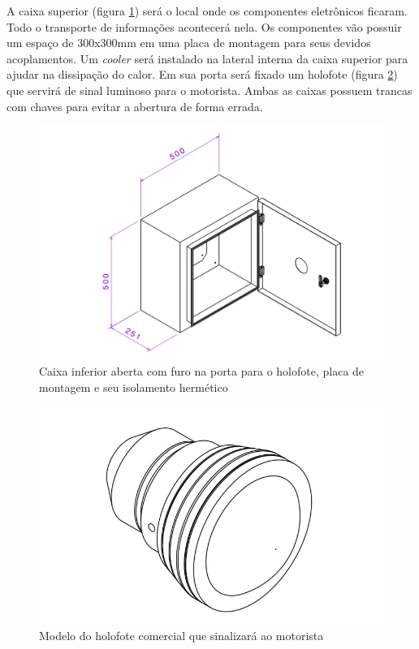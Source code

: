 A caixa superior (figura \ref{caixasup}) será o local onde os componentes eletrônicos ficaram. Todo o transporte de informações acontecerá nela. Os componentes vão possuir um espaço de 300x300mm em uma placa de montagem para seus devidos acoplamentos. Um \textit{cooler} será instalado na lateral interna da caixa superior para ajudar na dissipação do calor. Em sua porta será fixado um holofote (figura \ref{holof}) que servirá de sinal luminoso para o motorista. Ambas as caixas possuem trancas com chaves para evitar a abertura de forma errada.

\begin{figure}[H]
	\centering
    \includegraphics[keepaspectratio=true,scale=0.3]{figuras/caixasuperior.jpeg}
    \caption{Caixa inferior aberta com furo na porta para o holofote, placa de montagem e seu isolamento hermético}
    \label{caixasup}
\end{figure}

\begin{figure}[H]
	\centering
    \includegraphics[keepaspectratio=true,scale=0.3]{figuras/holofote.jpeg}
    \caption{Modelo do holofote comercial que sinalizará ao motorista}
    \label{holof}
\end{figure}

